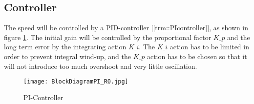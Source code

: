 \subsection{Controller}
\label{sec::controller}
The speed will be controlled by a PID-controller [\ref{trm::PIcontroller}], as shown in figure \ref{fig::picontrol}.
The initial gain will be controlled by the proportional factor $K\_p$ and the long term error by the integrating action $K\_i$. The $K\_i$ action has to be limited in order to prevent integral wind-up, and the $K\_p$ action has to be chosen so that it will not introduce too much overshoot and very little oscillation.

\begin{figure}[H]
\centering
\texttt{[image: BlockDiagramPI\_R0.jpg]}
\caption{PI-Controller}
\label{fig::picontrol}
\end{figure}

\newpage
